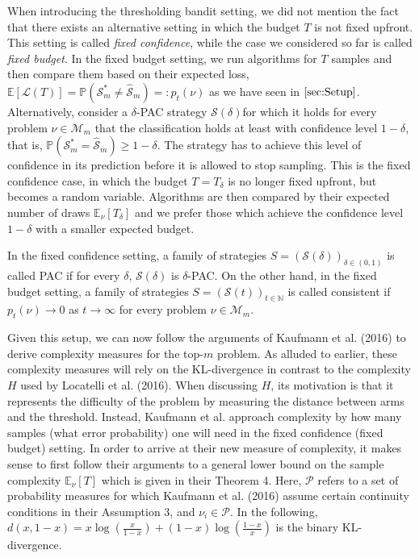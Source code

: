 \documentclass[11pt,]{article}
\begin{document}
When introducing the thresholding bandit setting, we did not mention the
fact that there exists an alternative setting in which the budget \(T\)
is not fixed upfront. This setting is called \emph{fixed confidence},
while the case we considered so far is called \emph{fixed budget}. In
the fixed budget setting, we run algorithms for \(T\) samples and then
compare them based on their expected loss,
\(\mathbb{E}[\mathcal{L}(T)] = \mathbb{P}(\mathcal{S}^*_m \neq \hat{\mathcal{S}}_m) =: p_t(\nu)\)
as we have seen in \(\autoref{sec:Setup}\). Alternatively, consider a
\(\delta\)-PAC strategy \(\mathcal{S}(\delta)\)for which it holds for
every problem \(\nu \in \mathcal{M}_m\) that the classification holds at
least with confidence level \(1-\delta\), that is,
\(\mathbb{P}(\mathcal{S}^*_m = \hat{\mathcal{S}}_m) \geq 1-\delta\). The
strategy has to achieve this level of confidence in its prediction
before it is allowed to stop sampling. This is the fixed confidence
case, in which the budget \(T=T_{\delta}\) is no longer fixed upfront,
but becomes a random variable. Algorithms are then compared by their
expected number of draws \(\mathbb{E}_{\nu}[T_{\delta}]\) and we prefer
those which achieve the confidence level \(1-\delta\) with a smaller
expected budget.

In the fixed confidence setting, a family of strategies
\(S = (\mathcal{S}(\delta))_{\delta \in (0,1)}\) is called PAC if for
every \(\delta\), \(\mathcal{S}(\delta)\) is \(\delta\)-PAC. On the
other hand, in the fixed budget setting, a family of strategies
\(S = (\mathcal{S}(t))_{t \in \mathbb{N}}\) is called consistent if
\(p_t(\nu) \rightarrow 0\) as \(t \rightarrow \infty\) for every problem
\(\nu \in \mathcal{M}_m\).

Given this setup, we can now follow the arguments of Kaufmann et al.
(2016) to derive complexity measures for the top-\(m\) problem. As
alluded to earlier, these complexity measures will rely on the
KL-divergence in contrast to the complexity \(H\) used by Locatelli et
al. (2016). When discussing \(H\), its motivation is that it represents
the difficulty of the problem by measuring the distance between arms and
the threshold. Instead, Kaufmann et al. approach complexity by how many
samples (what error probability) one will need in the fixed confidence
(fixed budget) setting. In order to arrive at their new measure of
complexity, it makes sense to first follow their arguments to a general
lower bound on the sample complexity \(\mathbb{E}_{\nu}[T]\) which is
given in their Theorem 4. Here, \(\mathcal{P}\) refers to a set of
probability measures for which Kaufmann et al. (2016) assume certain
continuity conditions in their Assumption 3, and
\(\nu_i \in \mathcal{P}\). In the following,
\(d(x,1-x) = x\log(\frac{x}{1-x}) + (1-x) \log(\frac{1-x}{x})\) is the
binary KL-divergence.
\end{document}
